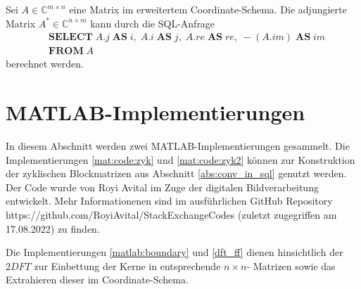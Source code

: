 Sei $A \in \mathbb{C}^{m \times n}$ eine Matrix im erweitertem Coordinate-Schema. Die adjungierte Matrix $A^* \in \mathbb{C}^{n \times m}$ kann durch die SQL-Anfrage
\begin{align*}
    & \mathbf{SELECT} \; A.j \; \mathbf{AS} \; i, \; A.i \; \mathbf{AS} \; j, \; A.re \;\mathbf{AS} \; re, \; -(A.im) \; \mathbf{AS} \; im  \\
    & \mathbf{FROM} \; A
\end{align*}
berechnet werden.
\section{MATLAB-Implementierungen}
\label{app:app_2}

In diesem Abschnitt werden zwei MATLAB-Implementierungen gesammelt. Die Implementierungen \ref{mat:code:zyk} und \ref{mat:code:zyk2} können zur Konstruktion der zyklischen Blockmatrizen aus Abschnitt \ref{abs:conv_in_sql} genutzt werden. Der Code wurde von Royi Avital im Zuge der digitalen Bildverarbeitung entwickelt. Mehr Informationenen sind im ausführlichen GitHub Repository https://github.com/RoyiAvital/StackExchangeCodes (zuletzt zugegriffen am 17.08.2022) zu finden.



Die Implementierungen \ref{matlab:boundary} und \ref{dft_ff} dienen hinsichtlich der $\mathrm{2}DFT$ zur Einbettung der Kerne in entsprechende $n \times n$- Matrizen sowie das Extrahieren dieser im Coordinate-Schema.



